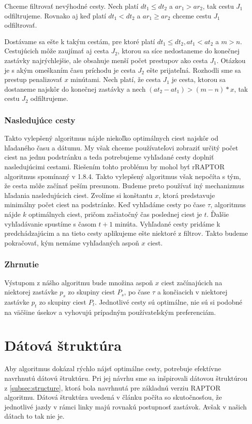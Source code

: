 Chceme filtrovať nevýhodné cesty. Nech platí $dt_1 \leq dt_2$ a $ar_1 > ar_2$, tak cestu $J_1$ odfiltrujeme. Rovnako aj keď platí $dt_1 < dt_2$ a $ar_1 \geq ar_2$ chceme cestu $J_1$ odfiltrovať. 

Dostávame sa ešte k takým cestám, pre ktoré platí $dt_1 \leq dt_2, at_1<at_2$ a $m>n$. Cestujúcich môže zaujímať aj cesta $J_2$, ktorou sa síce nedostaneme do konečnej zastávky najrýchlejšie, ale obsahuje menší počet prestupov ako cesta $J_1$. Otázkou je s akým omeškaním času príchodu je cesta $J_2$ ešte prijateľná. Rozhodli sme sa prestup penalizovať $x$ minútami. Nech platí, že cesta $J_1$ je cesta, ktorou sa dostaneme najskôr do konečnej zastávky a nech $(at_2-at_1) > (m-n) * x$, tak cestu $J_2$ odfiltrujeme.

\subsubsection{Nasledujúce cesty}
Takto vylepšený algoritmus nájde niekoľko optimálnych ciest najskôr od hľadaného času a dátumu. My však chceme používateľovi zobraziť určitý počet ciest na jednu podstránku a teda potrebujeme vyhľadané cesty doplniť nasledujúcimi cestami. 
Riešením tohto problému by mohol byť rRAPTOR algoritmus spomínaný v 1.8.4. Takto vylepšený algoritmus však nepočíta s tým, že cesta môže začínať peším presunom. Budeme preto používať iný mechanizmus hľadania nasledujúcich ciest.
Zvolíme si konštantu $x$, ktorá predstavuje minimálny počet ciest na podstránke. Keď vyhľadáme cesty po čase $\tau$, algoritmus nájde $k$ optimálnych ciest, pričom začiatočný čas poslednej ciest je $t$. Ďalšie vyhľadávanie spustíme s časom $t + 1$ minúta. Vyhľadané cesty pridáme k predchádzajúcim a na tieto cesty aplikujeme ešte niektoré z filtrov. Takto budeme pokračovať, kým nemáme vyhľadaných aspoň $x$ ciest.

\subsubsection{Zhrnutie}
Výstupom z nášho algoritmu bude množina aspoň $x$ ciest začínajúcich na niektorej zastávke $p_s$ zo skupiny ciest $P_s$, po čase $\tau$ a končiacich v niektorej zastávke $p_t$ zo skupiny ciest $P_t$. Jednotlivé cesty sú optimálne, nie sú si podobné na väčšine úsekov a vyhovujú prípadným používateľským preferenciám.

\section{Dátová štruktúra}
Aby algoritmus dokázal rýchlo nájsť optimálne cesty, potrebuje efektívne navrhnutú dátovú štruktúru. Pri jej návrhu sme sa inšpirovali dátovou štruktúrou z \ref{subsec:structure}, ktorá bola navrhnutá pre základnú verziu RAPTOR algoritmu. Dátová štruktúra uvedená v článku počíta so skutočnosťou, že jednotlivé jazdy v rámci linky majú rovnakú postupnosť zastávok. Avšak v našich dátach to tak nie je. 

